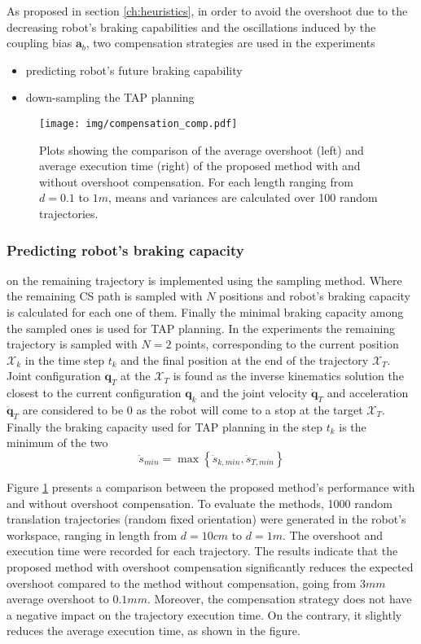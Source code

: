 As proposed in section \ref{ch:heuristics}, in order to avoid the overshoot due to the decreasing robot's braking capabilities and the oscillations induced by the coupling bias $\bm{a}_b$, two compensation strategies are used in the experiments
\begin{itemize}
    \item predicting robot's future braking capability
    \item down-sampling the TAP planning  
\end{itemize}

\begin{figure}[!tb]
    \centering
    \texttt{[image: img/compensation\_comp.pdf]}
    \caption{Plots showing the comparison of the average overshoot (left) and average execution time (right) of the proposed method with and without overshoot compensation. For each length ranging from $d=0.1$ to $1m$, means and variances are calculated over 100 random trajectories. }
    \label{fig:compensatiopn_comp}
\end{figure}

\subsubsection{Predicting robot's braking capacity} on the remaining trajectory is implemented using the sampling method. Where the remaining CS path is sampled with $N$ positions and robot's braking capacity is calculated for each one of them. Finally the minimal braking capacity among the sampled ones is used for TAP planning. In the experiments the remaining trajectory is sampled with $N=2$ points, corresponding to the current position $\mathcal{X}_k$ in the time step $t_k$ and the final position at the end of the trajectory $\mathcal{X}_T$. Joint configuration $\bm{q}_T$ at the $\mathcal{X}_T$ is found as the inverse kinematics solution the closest to the current configuration $\bm{q}_k$ and the joint velocity $\dot{\bm{q}}_T$ and acceleration $\ddot{\bm{q}}_T$ are considered to be $0$ as the robot will come to a stop at the target $\mathcal{X}_T$. Finally the braking capacity used for TAP planning in the step $t_k$ is the minimum of the two
\begin{equation}
    \ddot{s}_{min} = \max\left\{\ddot{s}_{k,min}, \ddot{s}_{T,min}\right\}
\end{equation}

Figure \ref{fig:compensatiopn_comp} presents a comparison between the proposed method's performance with and without overshoot compensation. To evaluate the methods, 1000 random translation trajectories (random fixed orientation) were generated in the robot's workspace, ranging in length from $d\!=\!10cm$ to $d\!=\!1m$. The overshoot and execution time were recorded for each trajectory. The results indicate that the proposed method with overshoot compensation significantly reduces the expected overshoot compared to the method without compensation, going from $3mm$ average overshoot to $0.1mm$. Moreover, the compensation strategy does not have a negative impact on the trajectory execution time. On the contrary, it slightly reduces the average execution time, as shown in the figure.

